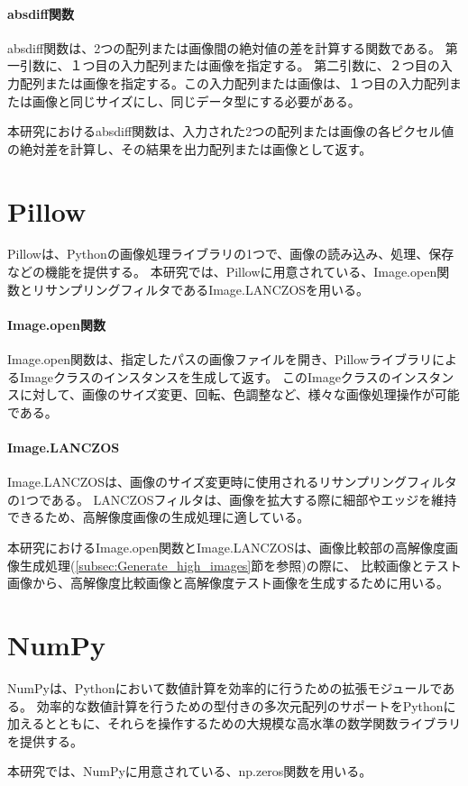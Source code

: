 \paragraph{absdiff関数}
absdiff関数は、2つの配列または画像間の絶対値の差を計算する関数である。
第一引数に、１つ目の入力配列または画像を指定する。
第二引数に、２つ目の入力配列または画像を指定する。この入力配列または画像は、１つ目の入力配列または画像と同じサイズにし、同じデータ型にする必要がある。
\par
本研究におけるabsdiff関数は、入力された2つの配列または画像の各ピクセル値の絶対差を計算し、その結果を出力配列または画像として返す。

\section{Pillow}\label{sec:pillow}
Pillow\cite{Pillow}は、Python\cite{Python}の画像処理ライブラリの1つで、画像の読み込み、処理、保存などの機能を提供する。
本研究では、Pillowに用意されている、Image.open関数とリサンプリングフィルタであるImage.LANCZOSを用いる。
\paragraph{Image.open関数}
Image.open関数\cite{ImageModule}は、指定したパスの画像ファイルを開き、PillowライブラリによるImageクラスのインスタンスを生成して返す。
このImageクラスのインスタンスに対して、画像のサイズ変更、回転、色調整など、様々な画像処理操作が可能である。
\paragraph{Image.LANCZOS}
Image.LANCZOSは、画像のサイズ変更時に使用されるリサンプリングフィルタの1つである\cite{LANCZOS}。
LANCZOSフィルタは、画像を拡大する際に細部やエッジを維持できるため、高解像度画像の生成処理に適している。
\par
本研究におけるImage.open関数とImage.LANCZOSは、画像比較部の高解像度画像生成処理(\ref{subsec:Generate_high_images}節を参照)の際に、
比較画像とテスト画像から、高解像度比較画像と高解像度テスト画像を生成するために用いる。

\section{NumPy}\label{sec:numpy}
NumPy\cite{NumPy}は、Pythonにおいて数値計算を効率的に行うための拡張モジュールである。
効率的な数値計算を行うための型付きの多次元配列のサポートをPythonに加えるとともに、それらを操作するための大規模な高水準の数学関数ライブラリを提供する。
\par
本研究では、NumPyに用意されている、np.zeros関数を用いる。
